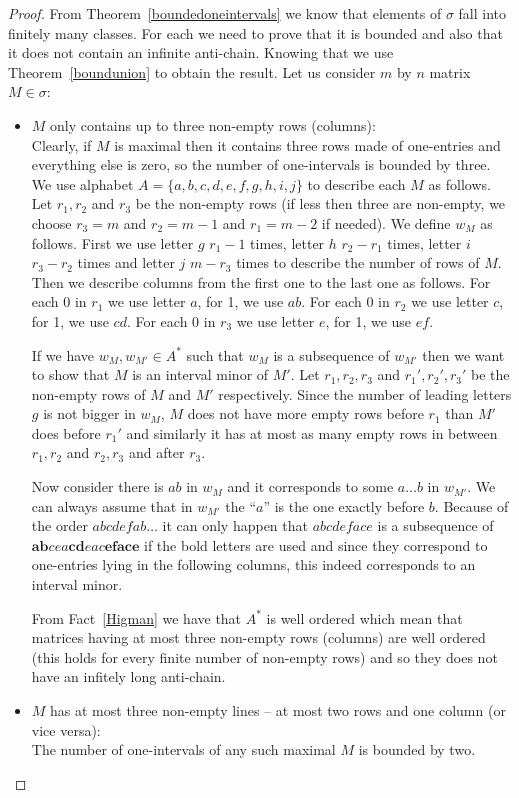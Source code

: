 \begin{proof}
From Theorem~\ref{boundedoneintervals} we know that elements of $\sigma$ fall into finitely many classes. For each we need to prove that it is bounded and also that it does not contain an infinite anti-chain. Knowing that we use Theorem~\ref{boundunion} to obtain the result. Let us consider $m$ by $n$ matrix $M\in\sigma$:
\begin{itemize}
	\item $M$ only contains up to three non-empty rows (columns):\\
		Clearly, if $M$ is maximal then it contains three rows made of one-entries and everything else is zero, so the number of one-intervals is bounded by three.\\
		
		We use alphabet $A=\{a,b,c,d,e,f,g,h,i,j\}$ to describe each $M$ as follows. Let $r_1,r_2$ and $r_3$ be the non-empty rows (if less then three are non-empty, we choose $r_3=m$ and $r_2=m-1$ and $r_1=m-2$ if needed). We define $w_M$ as follows. First we use letter $g$ $r_1-1$ times, letter $h$ $r_2-r_1$ times, letter $i$ $r_3-r_2$ times and letter $j$ $m-r_3$ times to describe the number of rows of $M$. Then we describe columns from the first one to the last one as follows. For each 0 in $r_1$ we use letter $a$, for 1, we use $ab$. For each 0 in $r_2$ we use letter $c$, for 1, we use $cd$. For each 0 in $r_3$ we use letter $e$, for 1, we use $ef$.
		
If we have $w_M,w_{M'}\in A^*$ such that $w_M$ is a subsequence of $w_{M'}$ then we want to show that $M$ is an interval minor of $M'$. Let $r_1,r_2,r_3$ and $r_1',r_2',r_3'$ be the non-empty rows of $M$ and $M'$ respectively. Since the number of leading letters $g$ is not bigger in $w_M$, $M$ does not have more empty rows before $r_1$ than $M'$ does before $r_1'$ and similarly it has at most as many empty rows in between $r_1,r_2$ and $r_2,r_3$ and after $r_3$.

Now consider there is $ab$ in $w_M$ and it corresponds to some $a\dots b$ in $w_{M'}$. We can always assume that in $w_{M'}$ the ``$a$'' is the one exactly before $b$. Because of the order $abcdefab\dots$ it can only happen that $abcdeface$ is a subsequence of $\textbf{ab}cea\textbf{cd}eac\textbf{eface}$ if the bold letters are used and since they correspond to one-entries lying in the following columns, this indeed corresponds to an interval minor.

From Fact~\ref{Higman} we have that $A^*$ is well ordered which mean that matrices having at most three non-empty rows (columns) are well ordered (this holds for every finite number of non-empty rows) and so they does not have an infitely long anti-chain.
	\item $M$ has at most three non-empty lines -- at most two rows and one column (or vice versa):\\
		The number of one-intervals of any such maximal $M$ is bounded by two.\\
		

\end{itemize}
\end{proof}
